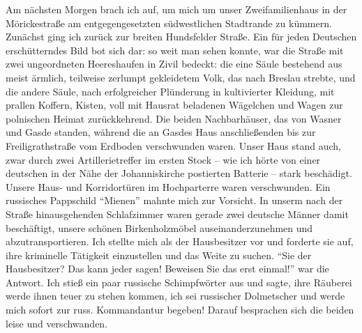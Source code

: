 \documentclass[a5paper,pagesize,10pt,twoside=true]{scrbook}
\renewcommand{\marginpar}[2][]{}
\begin{document}
Am nächsten Morgen brach ich auf, um mich um unser Zweifamilienhaus in der Mörickestraße am entgegengesetzten südwestlichen Stadtrande zu kümmern. Zunächst ging ich zurück zur breiten Hundsfelder Straße. Ein für jeden Deutschen erschütterndes Bild bot sich dar: so weit man sehen konnte, war die Straße mit zwei ungeordneten Heereshaufen in Zivil bedeckt: die eine Säule bestehend aus meist ärmlich, teilweise zerlumpt gekleidetem Volk, das nach Breslau strebte, und die andere Säule, nach erfolgreicher Plünderung in kultivierter Kleidung, mit prallen Koffern, Kisten, voll mit Hausrat beladenen Wägelchen und Wagen zur polnischen Heimat zurückkehrend. Die beiden Nachbarhäuser, das von Wasner und Gasde standen, während die an Gasdes Haus anschließenden bis zur Freiligrathstraße vom Erdboden verschwunden waren. Unser Haus stand auch, zwar durch zwei Artillerietreffer im ersten Stock -- wie ich hörte von einer deutschen in der Nähe der Johanniskirche postierten Batterie -- stark beschädigt. Unsere Haus- und Korridortüren im Hochparterre waren verschwunden. Ein russisches Pappschild \enquote{Mienen} mahnte mich zur Vorsicht. \marginpar{87} In unserm nach der Straße hinausgehenden Schlafzimmer waren gerade zwei deutsche Männer damit beschäftigt, unsere schönen Birkenholzmöbel auseinanderzunehmen und abzutransportieren. Ich stellte mich als der Hausbesitzer vor und forderte sie auf, ihre kriminelle Tätigkeit einzustellen und das Weite zu suchen. \enquote{Sie der Hausbesitzer? Das kann jeder sagen! Beweisen Sie das erst einmal!} war die Antwort. Ich stieß ein paar russische Schimpfwörter aus und sagte, ihre Räuberei werde ihnen teuer zu stehen kommen, ich sei russischer Dolmetscher und werde mich sofort zur russ. Kommandantur begeben! Darauf besprachen sich die beiden leise und verschwanden.
\end{document}
